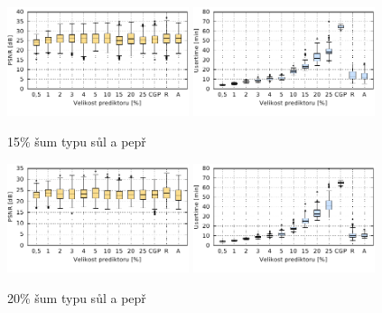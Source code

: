 \begin{figure}[H]
    \centering
    \includegraphics[width=0.475\textwidth]{fig/plot/compare/saltpepper15-100kg-psnrtest.pdf}
    \hskip0.5cm
    \includegraphics[width=0.475\textwidth]{fig/plot/compare/saltpepper15-100kg-usertime.pdf}
    \caption{15\% šum typu sůl a pepř}
\end{figure}

\begin{figure}[H]
    \centering
    \includegraphics[width=0.475\textwidth]{fig/plot/compare/saltpepper20-100kg-psnrtest.pdf}
    \hskip0.5cm
    \includegraphics[width=0.475\textwidth]{fig/plot/compare/saltpepper20-100kg-usertime.pdf}
    \caption{20\% šum typu sůl a pepř}
\end{figure}

